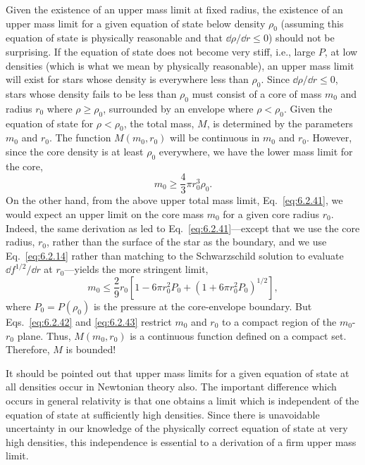 Given the existence of an upper mass limit at fixed radius, the existence of an
upper mass limit for a given equation of state below density \(\rho_0\) (assuming
this equation of state is physically reasonable and that \(\dd\rho/\dd r\leq0\))
should not be surprising. If the equation of state does not become very stiff,
i.e., large \(P\), at low densities (which is what we mean by physically
reasonable), an upper mass limit will exist for stars whose density is everywhere
less than \(\rho_0\). Since \(\dd\rho/\dd r\leq0\), stars whose density fails to be
less than \(\rho_0\) must consist of a core of mass \(m_0\) and radius \(r_0\)
where \(\rho\geq\rho_0\), surrounded by an envelope where \(\rho<\rho_0\). Given
the equation of state for \(\rho<\rho_0\), the total mass, \(M\), is determined by
the parameters \(m_0\) and \(r_0\). The function \(M(m_0,r_0)\) will be continuous
in \(m_0\) and \(r_0\). However, since the core density is at least \(\rho_0\)
everywhere, we have the lower mass limit for the core,
\begin{equation}
  m_0\geq\frac43\pi r_0^3\rho_0.
  \tag{6.2.42}\label{eq:6.2.42}
\end{equation}
On the other hand, from the above upper total mass limit,
Eq.~\eqref{eq:6.2.41}, we would expect an upper limit on the core mass \(m_0\)
for a given core radius \(r_0\). Indeed, the same derivation as led to
Eq.~\eqref{eq:6.2.41}---except that we use the core radius, \(r_0\), rather than
the surface of the star as the boundary, and we use Eq.~\eqref{eq:6.2.14} rather
than matching to the Schwarzschild solution to evaluate \(\dd f^{1/2}/\dd r\) at
\(r_0\)---yields the more stringent limit,
\begin{equation}
  m_0\leq\frac29r_0\left[1-6\pi r_0^2P_0+
      (1+6\pi r_0^2P_0)^{1/2}\right],
  \tag{6.2.43}\label{eq:6.2.43}
\end{equation}
where \(P_0=P(\rho_0)\) is the pressure at the core-envelope boundary. But
Eqs.~\eqref{eq:6.2.42} and \eqref{eq:6.2.43} restrict \(m_0\) and \(r_0\) to a
compact region of the \(m_0\)-\(r_0\) plane. Thus, \(M(m_0,r_0)\) is a continuous
function defined on a compact set. Therefore, \(M\) is bounded!

It should be pointed out that upper mass limits for a given equation of state at
all densities occur in Newtonian theory also. The important difference which
occurs in general relativity is that one obtains a limit which is independent of
the equation of state at sufficiently high densities. Since there is unavoidable
uncertainty in our knowledge of the physically correct equation of state at very
high densities, this independence is essential to a derivation of a firm upper mass
limit.


